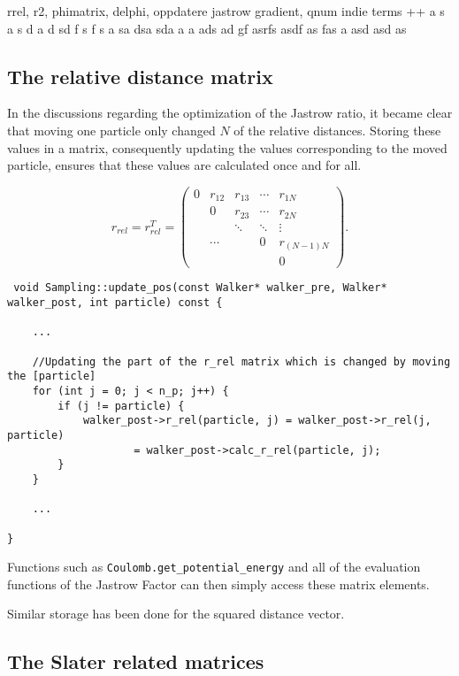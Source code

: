 rrel, r2, phimatrix, delphi, oppdatere jastrow gradient, qnum indie terms ++ a s a s d a d sd f s f s a sa dsa sda a a  ads ad  gf asrfs asdf as fas  a asd asd as 



\subsection{The relative distance matrix}

In the discussions regarding the optimization of the Jastrow ratio, it became clear that moving one particle only changed $N$ of the relative distances. Storing these values in a matrix, consequently updating the values corresponding to the moved particle, ensures that these values are calculated once and for all.

\begin{equation}
r_{rel} = r_{rel}^T = \left( \begin{array}{ccccc}
0 & r_{12} & r_{13} & \cdots & r_{1N} \\
 & 0 & r_{23} & \cdots & r_{2N}  \\
 &  & \ddots & \ddots & \vdots \\
 & \cdots &  & 0 & r_{(N-1)N} \\
 &  &  &  & 0\end{array} \right).
\end{equation}

\begin{lstlisting}
 void Sampling::update_pos(const Walker* walker_pre, Walker* walker_post, int particle) const {

    ...

    //Updating the part of the r_rel matrix which is changed by moving the [particle]
    for (int j = 0; j < n_p; j++) {
        if (j != particle) {
            walker_post->r_rel(particle, j) = walker_post->r_rel(j, particle)
                    = walker_post->calc_r_rel(particle, j);
        }
    }
    
    ...

}
\end{lstlisting}


Functions such as \verb+Coulomb.get_potential_energy+ and all of the evaluation functions of the Jastrow Factor can then simply access these matrix elements.

Similar storage has been done for the squared distance vector. 

\subsection{The Slater related matrices}
\label{sec:storeSlater}

